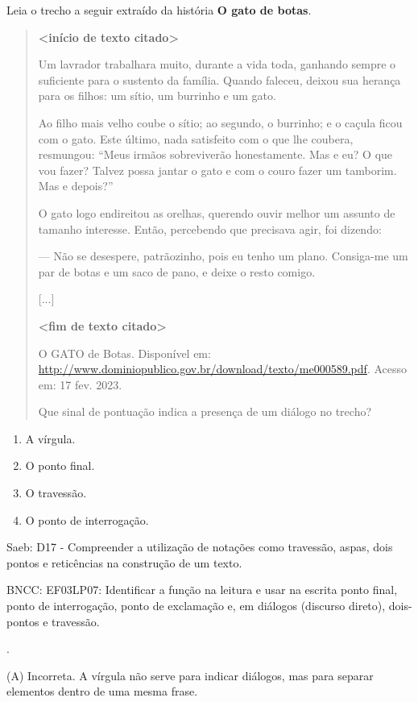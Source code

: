 Leia o trecho a seguir extraído da história \textbf{O gato de botas}.

\begin{quote}
\textbf{\textless{}início de texto citado\textgreater{}}

Um lavrador trabalhara muito, durante a vida toda, ganhando sempre o
suficiente para o sustento da família. Quando faleceu, deixou sua
herança para os filhos: um sítio, um burrinho e um gato.

Ao filho mais velho coube o sítio; ao segundo, o burrinho; e o caçula
ficou com o gato. Este último, nada satisfeito com o que lhe coubera,
resmungou: ``Meus irmãos sobreviverão honestamente. Mas e eu? O que vou
fazer? Talvez possa jantar o gato e com o couro fazer um tamborim. Mas e
depois?''

O gato logo endireitou as orelhas, querendo ouvir melhor um assunto de
tamanho interesse. Então, percebendo que precisava agir, foi dizendo:

--- Não se desespere, patrãozinho, pois eu tenho um plano. Consiga-me um
par de botas e um saco de pano, e deixe o resto comigo.

{[}...{]}

\textbf{\textless{}fim de texto citado\textgreater{}}

O GATO de Botas. Disponível em:
\url{http://www.dominiopublico.gov.br/download/texto/me000589.pdf}.
Acesso em: 17 fev. 2023.

Que sinal de pontuação indica a presença de um diálogo no trecho?
\end{quote}

\begin{enumerate}
\def\labelenumi{(\Alph{enumi})}
\item
  A vírgula.
\item
  O ponto final.
\item
  O travessão.
\item
  O ponto de interrogação.
\end{enumerate}

\protect\hypertarget{_Hlk127521720}{}{}Saeb: D17 - Compreender a
utilização de notações como travessão, aspas, dois pontos e reticências
na construção de um texto.

BNCC: EF03LP07: Identificar a função na leitura e usar na escrita ponto
final, ponto de interrogação, ponto de exclamação e, em diálogos
(discurso direto), dois-pontos e travessão.

.

(A) Incorreta. A vírgula não serve para indicar diálogos, mas para
separar elementos dentro de uma mesma frase.

